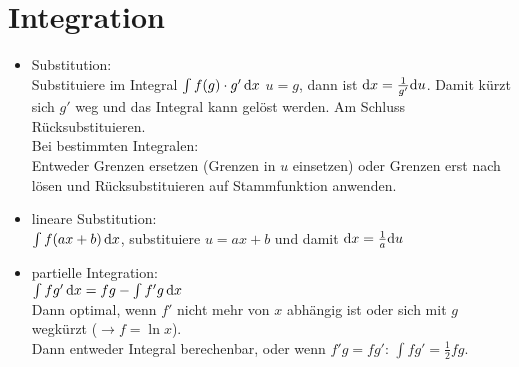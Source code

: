 \chapter{Integration}
\begin{itemize}
\item Substitution:\\
Substituiere im Integral $\int f(g)\cdot g' \,\mathrm{d}x$  $u=g$, dann ist $\mathrm{d}x=\frac{1}{g'}\mathrm{d}u$. Damit kürzt sich $g'$ weg und das Integral kann gelöst werden. Am Schluss Rücksubstituieren.\\
Bei bestimmten Integralen:\\
Entweder Grenzen ersetzen (Grenzen in $u$ einsetzen) oder Grenzen erst nach lösen und Rücksubstituieren auf Stammfunktion anwenden.
\item lineare Substitution:\\
$\int f(ax+b)\,\mathrm{d}x$, substituiere $u=ax+b$ und damit $\mathrm{d}x=\frac{1}{a}\mathrm{d}u$
\item partielle Integration:\\
$\int f g' \,\mathrm{d}x=fg-\int f' g \,\mathrm{d}x$\\
Dann optimal, wenn $f'$ nicht mehr von $x$ abhängig ist oder sich mit $g$ wegkürzt ($\to f=\ln x$).\\
Dann entweder Integral berechenbar, oder wenn $f'g = fg'$: $\int fg'=\frac{1}{2}fg$.
\end{itemize}
